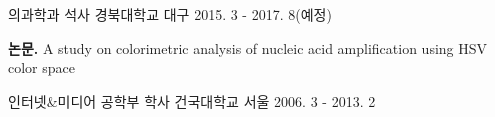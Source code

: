 \begin{cventries}
  \cventry
    {의과학과 석사}
    {경북대학교}
    {대구}
    {2015. 3 - 2017. 8(예정)}
    {
      \begin{cvitems}
        \item {\textbf{논문.} A study on colorimetric analysis of nucleic acid amplification using HSV color space}
      \end{cvitems}
    }
  \cventry
    {인터넷\&미디어 공학부 학사}
    {건국대학교}
    {서울}
    {2006. 3 - 2013. 2}
    {
    }
\end{cventries}
